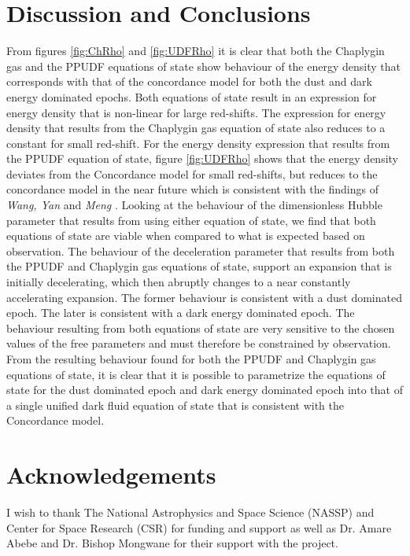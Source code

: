 \documentclass[a4paper, 11pt]{FSKH_623_Report}
\numberwithin{equation}{section}
\begin{document}
\section{Discussion and Conclusions}
From figures \ref{fig:ChRho} and \ref{fig:UDFRho} it is clear that both the Chaplygin gas and the PPUDF equations of state show behaviour of the energy density that corresponds with that of the concordance model for both the dust and dark energy dominated epochs. Both equations of state result in an expression for energy density that is non-linear for large red-shifts. The expression for energy density that results from the Chaplygin gas equation of state also reduces to a constant for small red-shift. For the energy density expression that results from the PPUDF equation of state, figure \ref{fig:UDFRho} shows that the energy density deviates from the Concordance model for small red-shifts, but reduces to the concordance model in the near future which is consistent with the findings of \textit{Wang, Yan} and \textit{Meng} \citep{wang2017new}. Looking at the behaviour of the dimensionless Hubble parameter that results from using either equation of state, we find that both equations of state are viable when compared to what is expected based on observation. The behaviour of the deceleration parameter that results from both the PPUDF and Chaplygin gas equations of state, support an expansion that is initially decelerating, which then abruptly changes to a near constantly accelerating expansion. The former behaviour is consistent with a dust dominated epoch. The later is consistent with a dark energy dominated epoch. The behaviour resulting from both equations of state are very sensitive to the chosen values of the free parameters and must therefore be constrained by observation.\\
From the resulting behaviour found for both the PPUDF and Chaplygin gas equations of state, it is clear that it is possible to parametrize the equations of state for the dust dominated epoch and dark energy dominated epoch into that of a single unified dark fluid equation of state that is consistent with the Concordance model.

\section{Acknowledgements}
I wish to thank The National Astrophysics and Space Science (NASSP) and  Center for Space Research (CSR) for funding and support as well as Dr. Amare Abebe  and Dr. Bishop Mongwane for their support with the project.
\end{document}
